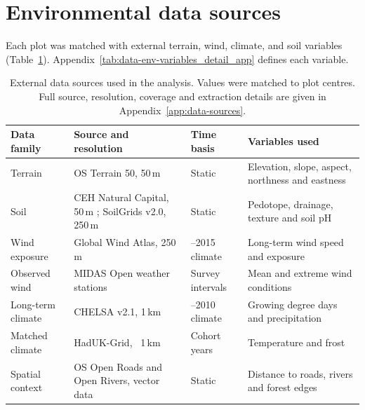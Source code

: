 \documentclass[logo,msc,ai]{infthesis}           %
\begin{document}
\section{Environmental data sources}
\label{sec:data-environmental}

Each plot was matched with external terrain, wind, climate, and soil variables (Table~\ref{tab:data-env-sources}). Appendix~\ref{tab:data-env-variables_detail_app} defines each variable.

\begin{table}[!htbp]
\centering
\scriptsize
\setlength{\tabcolsep}{4pt}
\renewcommand{\arraystretch}{1.05}
\begin{tabular}{ >{\raggedright\arraybackslash}p{2.0cm} >{\raggedright\arraybackslash}p{4.2cm} >{\raggedright\arraybackslash}p{2.3cm} >{\raggedright\arraybackslash}p{4.0cm}}
\hline
Data family & Source and resolution & Time basis & Variables used \\
\hline
Terrain & OS Terrain 50, 50\,m \cite{ordnancesurveyTerrain50_C3_LID} & Static & Elevation, slope, aspect, northness and eastness \\

Soil & CEH Natural Capital, 50\,m \cite{feeney2026CEHNaturalCapital_C3_LID}; SoilGrids v2.0, 250\,m \cite{poggio2021SoilGrids_C3_LID} & Static & Pedotope, drainage, texture and soil pH \\

Wind exposure & Global Wind Atlas, 250\,m \cite{davis2023GlobalWindAtlas_C3_LID} & 2006--2015 climate & Long-term wind speed and exposure \\

Observed wind & MIDAS Open weather stations \cite{metoffice2019MIDASOpen_C3_LID} & Survey intervals & Mean and extreme wind conditions \\

Long-term climate & CHELSA v2.1, 1\,km \cite{karger2021CHELSA_C3_LID} & 1981--2010 climate & Growing degree days and precipitation \\

Matched climate & HadUK-Grid, ~1\,km \cite{hollis2019HadUKGrid_C3_LID} & Cohort years & Temperature and frost \\

Spatial context & OS Open Roads and Open Rivers, vector data
\cite{ordnancesurveyOpenRoads_C3_LID,ordnancesurveyOpenRivers_C3_LID} & Static & Distance to roads, rivers and forest edges \\
\hline
\end{tabular}

\caption{\small{External data sources used in the analysis. Values were matched to plot centres. Full source, resolution, coverage and extraction details are given in Appendix~\ref{app:data-sources}.}}
\label{tab:data-env-sources}
\end{table}
\end{document}
